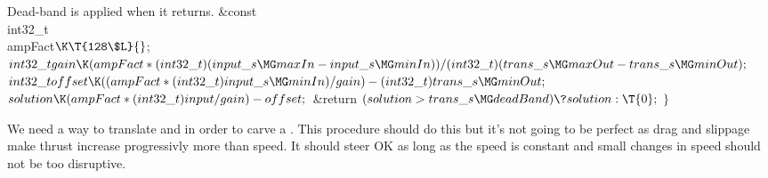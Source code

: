 Dead-band is applied when it returns.
\Y\B\&{const} \\{int32\_t}\\{ampFact}${}\K\T{128\$L}{}$;\7
${}\\{int32\_t}\\{gain}\K(\\{ampFact}*(\\{int32\_t})(\\{input\_s}\MG\\{maxIn}-%
\\{input\_s}\MG\\{minIn}))/(\\{int32\_t})(\\{trans\_s}\MG\\{maxOut}-\\{trans%
\_s}\MG\\{minOut});{}$\6
${}\\{int32\_t}\\{offset}\K((\\{ampFact}*(\\{int32\_t})\\{input\_s}\MG%
\\{minIn})/\\{gain})-(\\{int32\_t})\\{trans\_s}\MG\\{minOut};{}$\6
${}\\{solution}\K(\\{ampFact}*(\\{int32\_t})\\{input}/\\{gain})-\\{offset};{}$\6
\&{return} ${}(\\{solution}>\\{trans\_s}\MG\\{deadBand})\?\\{solution}:\T{0};$
$\}{}$\par
\fi

We need a way to translate  and  in order to
carve a
. This procedure should do this but it's not going to be perfect
as
drag and slippage make thrust increase progressivly more than speed.
It should steer OK as long as the speed is constant and small changes in speed
should not be too disruptive.


